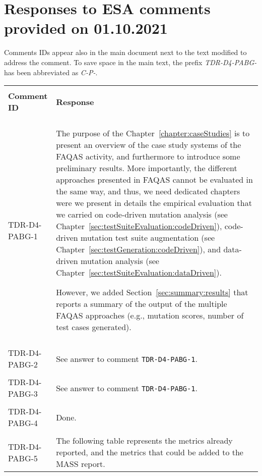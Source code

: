 
\section{Responses to ESA comments provided on 01.10.2021}
\label{sec:ESA:comments:1}

Comments IDs appear also in the main document next to the text modified to address the comment. To save space in the main text, the prefix \emph{TDR-D4-PABG-} has been abbreviated as \emph{C-P-}.

\setlength\LTleft{0pt}
\setlength\LTright{0pt}
\tiny
\begin{longtable}{|p{2cm}|p{12cm}|@{}}
\hline
\\
\textbf{Comment ID}&\textbf{Response}\\
\\
\hline
TDR-D4-PABG-1&
\begin{minipage}{12cm}
The purpose of the Chapter~\ref{chapter:caseStudies} is to present an overview of the case study systems of the FAQAS activity, and furthermore to introduce some preliminary results. More importantly, the different approaches presented in FAQAS cannot be evaluated in the same way, and thus, we need dedicated chapters were we present in details the empirical evaluation that we carried on code-driven mutation analysis (see Chapter~\ref{sec:testSuiteEvaluation:codeDriven}), code-driven mutation test suite augmentation (see Chapter~\ref{sec:testGeneration:codeDriven}), and data-driven mutation analysis (see Chapter~\ref{sec:testSuiteEvaluation:dataDriven}).

However, we added Section~\ref{sec:summary:results} that reports a summary of the output of the multiple FAQAS approaches (e.g., mutation scores, number of test cases generated).
\end{minipage}\\
\\
\hline
TDR-D4-PABG-2&
\begin{minipage}{12cm}
See answer to comment \texttt{TDR-D4-PABG-1}.
\end{minipage}\\
\\
\hline
TDR-D4-PABG-3&
\begin{minipage}{12cm}
See answer to comment \texttt{TDR-D4-PABG-1}.
\end{minipage}\\
\\
\hline
TDR-D4-PABG-4&
\begin{minipage}{12cm}
Done.
\end{minipage}\\
\\
\hline
TDR-D4-PABG-5&
\begin{minipage}{12cm}
The following table represents the metrics already reported, and the metrics that could be added to the MASS report.


\end{minipage}
\end{longtable}
